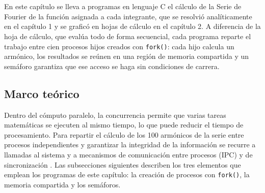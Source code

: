 %
%
%
%

\chapter{\TituloCapTres}
\label{cap:03}

En este capítulo se lleva a programas en lenguaje C el cálculo de la Serie de Fourier de la función asignada a cada integrante, que se resolvió analíticamente en el capítulo 1 y se graficó en hojas de cálculo en el capítulo 2. A diferencia de la hoja de cálculo, que evalúa todo de forma secuencial, cada programa reparte el trabajo entre cien procesos hijos creados con \texttt{fork()}: cada hijo calcula un armónico, los resultados se reúnen en una región de memoria compartida y un semáforo garantiza que ese acceso se haga sin condiciones de carrera.

\section{Marco teórico}
\label{sec:cap03:marco}

Dentro del cómputo paralelo, la concurrencia permite que varias tareas matemáticas se ejecuten al mismo tiempo, lo que puede reducir el tiempo de procesamiento. Para repartir el cálculo de los 100 armónicos de la serie entre procesos independientes y garantizar la integridad de la información se recurre a llamadas al sistema y a mecanismos de comunicación entre procesos (IPC) y de sincronización \cite{silberschatz:os-concepts:2018,stevens:advanced-unix-programming:2013}. Las subsecciones siguientes describen los tres elementos que emplean los programas de este capítulo: la creación de procesos con \texttt{fork()}, la memoria compartida y los semáforos.

